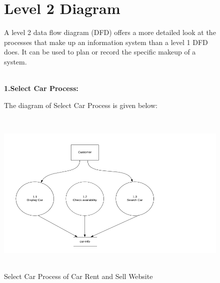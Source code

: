 \noindent 
\begin{figure}


\section{Level 2 Diagram}

\noindent A level 2 data flow diagram (DFD) offers a more detailed look at the processes that make up an information system than a level 1 DFD does. It can be used to plan or record the specific makeup of a system.

\noindent \\


\textbf{1.Select Car Process:}


\noindent \textbf{}

\noindent 

\noindent The diagram of Select Car Process is given below:

\noindent 

\noindent \includegraphics*[width=5.70in, height=3.17in, keepaspectratio=false]{figures/SelectCar}

\noindent 

\caption{Select Car Process of Car Rent and Sell Website}
\end{figure}
\noindent 

\noindent 

